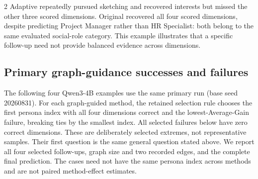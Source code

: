 \documentclass{ieeeaccess}
\begin{document}
\begin{multicols*}{2}
Adaptive repeatedly pursued sketching and recovered interests but missed the other three scored dimensions. Original recovered all four scored dimensions, despite predicting Project Manager rather than HR Specialist: both belong to the same evaluated social-role category. This example illustrates that a specific follow-up need not provide balanced evidence across dimensions.

\subsection{Primary graph-guidance successes and failures}
The following four Qwen3-4B examples use the same primary run (base seed 20260831).
For each graph-guided method, the retained selection rule chooses the first persona
index with all four dimensions correct and the lowest-Average-Gain failure, breaking
ties by the smallest index. All selected failures below have zero correct dimensions.
These are deliberately selected extremes, not representative samples. Their first
question is the same general question stated above. We report all four selected
follow-ups, graph size and two recorded edges, and the complete final prediction.
The cases need not have the same persona index across methods and are not paired
method-effect estimates.

\end{multicols*}
\end{document}
